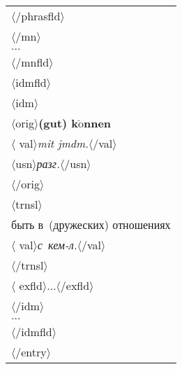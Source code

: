 \begin{multicols}{2}
\noindent
   {\small 
  \begin{tabular}{l}
     \hspace*{6mm}$\langle$/{\sf phrasfld}$\rangle$\\
           \hspace*{3mm}$\langle$/{\sf mn}$\rangle$\\
  \hspace*{3mm}$\ldots$\\
  $\langle$/{\sf mnfld}$\rangle$\\
  $\langle${\sf idmfld}$\rangle$\\
  \hspace*{3mm}$\langle${\sf idm}$\rangle$\\
  \hspace*{6mm}$\langle${\sf orig}$\rangle$\textbf{(gut) 
k$\ddot{\mbox{o}}$nnen}\\ 
  \hspace*{8mm}$\langle${\sf 
val}$\rangle$\textit{mit jmdm.}$\langle$/{\sf val}$\rangle$\\
  \hspace*{8mm}$\langle${\sf usn}$\rangle$\textit{разг.}$\langle$/{\sf usn}$\rangle$\\
  \hspace*{6mm}$\langle$/{\sf orig}$\rangle$\\
  \hspace*{6mm}$\langle${\sf trnsl}$\rangle$\\
  \hspace*{8mm}быть в~(дружеских) отношениях\\
  \hspace*{8mm}$\langle${\sf 
val}$\rangle$\textit{с~кем-л.}$\langle$/{\sf val}$\rangle$\\
  \hspace*{6mm}$\langle$/{\sf trnsl}$\rangle$\\
  \hspace*{6mm}$\langle${\sf 
exfld}$\rangle$$\ldots$$\langle$/{\sf exfld}$\rangle$\\
  \hspace*{3mm}$\langle$/{\sf idm}$\rangle$\\
  \hspace*{3mm}$\ldots$\\
  $\langle$/{\sf idmfld}$\rangle$\\
  $\langle$/{\sf entry}$\rangle$
  \end{tabular}
  }
  
  \vspace*{2pt}
  

\end{multicols}
